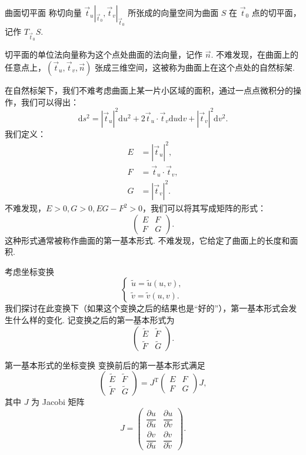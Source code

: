\begin{definition}{}{曲面切平面}
    称切向量 $\vec{t}_u |_{\vec{t}_0}, \vec{t}_v |_{\vec{t}_0}$ 所张成的向量空间为曲面 $S$ 在 $\vec{t}_0$ 点的切平面，记作 $T_{\vec{t}_0} S$.
\end{definition}

切平面的单位法向量称为这个点处曲面的法向量，记作 $\vec{n}$. 不难发现，在曲面上的任意点上，$(\vec{t}_u, \vec{t}_v, \vec{n})$ 张成三维空间，这被称为曲面上在这个点处的自然标架.

在自然标架下，我们不难考虑曲面上某一片小区域的面积，通过一点点微积分的操作，我们可以得出：
\[
    \mathrm{d} s^2 = |\vec{t}_u|^2 \mathrm{d} u^2 + 2 \vec{t}_u \cdot \vec{t}_v \mathrm{d} u \mathrm{d} v + |\vec{t}_v|^2 \mathrm{d} v^2.
\]
我们定义：
\begin{align*}
    E &= |\vec{t}_u|^2, \\
    F &= \vec{t}_u \cdot \vec{t}_v, \\
    G &= |\vec{t}_v|^2.
\end{align*}
不难发现，$E > 0, G > 0, E G - F^2 > 0$，我们可以将其写成矩阵的形式：
\[
    \begin{pmatrix}
        E & F \\
        F & G
    \end{pmatrix}.
\]
这种形式通常被称作曲面的第一基本形式. 不难发现，它给定了曲面上的长度和面积.

考虑坐标变换
\[
\begin{cases}
    \tilde{u} = \tilde{u}(u, v), \\
    \tilde{v} = \tilde{v}(u, v).
\end{cases}
\]
我们探讨在此变换下（如果这个变换之后的结果也是``好的''），第一基本形式会发生什么样的变化. 记变换之后的第一基本形式为
\[
    \begin{pmatrix}
        \tilde{E} & \tilde{F} \\
        \tilde{F} & \tilde{G}
    \end{pmatrix}.
\]

\begin{theorem}{}{第一基本形式的坐标变换}
    变换前后的第一基本形式满足
    \[
        \begin{pmatrix}
            \tilde{E} & \tilde{F} \\
            \tilde{F} & \tilde{G}
        \end{pmatrix}
        =
        J^\mathrm{T}
        \begin{pmatrix}
            E & F \\
            F & G
        \end{pmatrix}
        J,
    \]
    其中 $J$ 为 Jacobi 矩阵
    \[
        J =
        \begin{pmatrix}
            \dfrac{\partial u}{\partial \tilde{u}} & \dfrac{\partial u}{\partial \tilde{v}} \\[1.2ex]
            \dfrac{\partial v}{\partial \tilde{u}} & \dfrac{\partial v}{\partial \tilde{v}}
        \end{pmatrix}.
    \]
\end{theorem}

